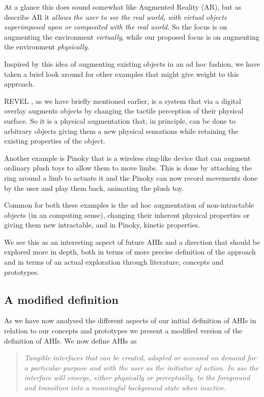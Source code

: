 At a glance this does sound somewhat like Augmented Reality (AR), but as \citet{azuma1997survey} describe AR it \emph{allows the user to see the real world, with virtual objects superimposed upon or composited with the real world.}
So the focus is on augmenting the environment \emph{virtually}, while our proposed focus is on augmenting the environment \emph{physically}.

Inspired by this idea of augmenting existing objects in an ad hoc fashion, we have taken a brief look around for other examples that might give weight to this approach.

REVEL \citep{bau2013revel}, as we have briefly mentioned earlier, is a system that via a digital overlay augments objects by changing the tactile perception of their physical surface.
So it is a physical augmentation that, in principle, can be done to arbitrary objects giving them a new physical sensations while retaining the existing properties of the object.

Another example is Pinoky \citep{sugiura2012pinoky} that is a wireless ring-like device that can augment ordinary plush toys to allow them to move limbs.
This is done by attaching the ring around a limb to actuate it and the Pinoky can now record movements done by the user and play them back, animating the plush toy.

Common for both these examples is the ad hoc augmentation of non-intractable objects (in an computing sense), changing their inherent physical properties or giving them new intractable, and in Pinoky, kinetic properties.

We see this as an interesting aspect of future AHIs and a direction that should be explored more in depth, both in terms of more precise definition of the approach and in terms of an actual exploration through literature, concepts and prototypes.

\subsection{A modified definition}
As we have now analysed the different aspects of our initial definition of AHIs in relation to our concepts and prototypes we present a modified version of the definition of AHIs.
We now define AHIs as
\begin{quotation}
\emph{Tangible interfaces that can be created, adapted or accessed on demand for a particular purpose and with the user as the initiator of action. In use the interface will emerge, either physically or perceptually, to the foreground and transition into a meaningful background state when inactive.}
\end{quotation}


